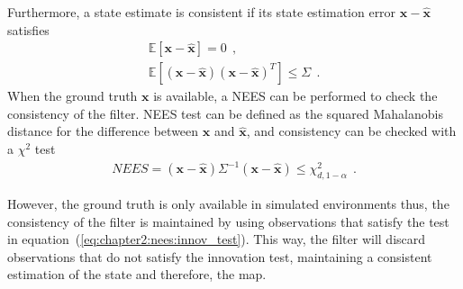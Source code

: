 Furthermore, a state estimate is consistent if its state estimation error $\bm{x} - \hat{\bm{x}}$ satisfies
\begin{align*}
    \mathbb{E}\left[\bm{x} - \hat{\bm{x}}\right] = 0~~,\\
    \mathbb{E}\left[\left(\bm{x} - \hat{\bm{x}}\right)\left(\bm{x} - \hat{\bm{x}}\right)^T\right] \le \Sigma~~.
\end{align*}
When the ground truth $\bm{x}$ is available, a \ac{NEES} can be performed to check the consistency of the filter. \ac{NEES} test can be defined as the squared Mahalanobis distance for the difference between $\bm{x}$ and $\hat{\bm{x}}$, and consistency can be checked with a $\chi^2$ test
\begin{align*}
    NEES = \left(\bm{x} - \hat{\bm{x}}\right) \Sigma^{-1} \left(\bm{x} - \hat{\bm{x}}\right) \le \chi_{d, 1-\alpha}^2~~.
\end{align*}

However, the ground truth is only available in simulated environments thus, the consistency of the filter is maintained by using observations that satisfy the test in equation~(\ref{eq:chapter2:nees:innov_test}). This way, the filter will discard observations that do not satisfy the innovation test, maintaining a consistent estimation of the state and therefore, the map.
